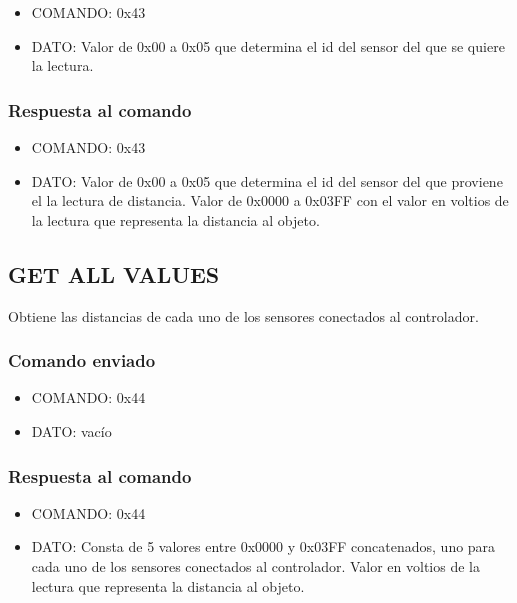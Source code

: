 \documentclass[a4paper,10pt]{article}
\begin{document}
\begin{itemize}
	\item{COMANDO:} 0x43
	\item{DATO:} Valor de 0x00 a 0x05 que determina el id del sensor del que se quiere la lectura.
\end{itemize}

\subsubsection*{Respuesta al comando}

\begin{itemize}
	\item{COMANDO:} 0x43
	\item{DATO:} Valor de 0x00 a 0x05 que determina el id del sensor del que proviene el la lectura de distancia.
	Valor de 0x0000 a 0x03FF con el valor en voltios de la lectura que representa la distancia al objeto.
\end{itemize}

\subsection{GET ALL VALUES}
\label{get_all_values_fs}

Obtiene las distancias de cada uno de los sensores conectados al controlador.

\subsubsection*{Comando enviado}

\begin{itemize}
	\item{COMANDO:} 0x44
	\item{DATO:} vac\'io
\end{itemize}

\subsubsection*{Respuesta al comando}

\begin{itemize}
	\item{COMANDO:} 0x44
	\item{DATO:} Consta de 5 valores entre 0x0000 y 0x03FF concatenados, uno para cada uno de los sensores conectados al controlador.
	Valor en voltios de la lectura que representa la distancia al objeto.
\end{itemize}
\end{document}
